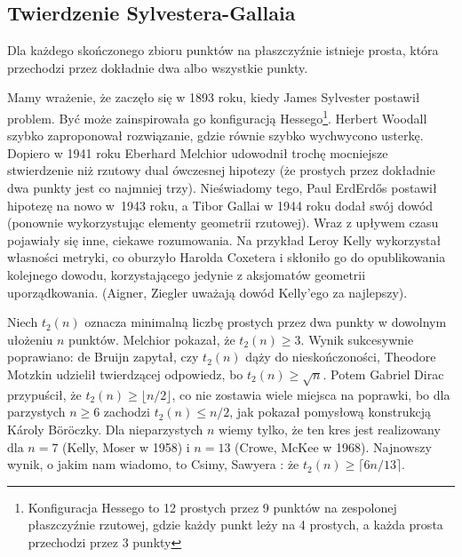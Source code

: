 

\subsection{Twierdzenie Sylvestera-Gallaia}
\begin{theorem}
	Dla każdego skończonego zbioru punktów na płaszczyźnie istnieje prosta, która przechodzi przez dokładnie dwa albo wszystkie punkty.
\end{theorem}

Mamy wrażenie, że zaczęło się w 1893 roku, kiedy James Sylvester postawił problem.
Być może zainspirowała go konfiguracją Hessego\footnote{Konfiguracja Hessego to 12 prostych przez 9 punktów na zespolonej płaszczyźnie rzutowej, gdzie każdy punkt leży na 4 prostych, a każda prosta przechodzi przez 3 punkty}.
Herbert Woodall szybko zaproponował rozwiązanie, gdzie równie szybko wychwycono usterkę.
Dopiero w 1941 roku Eberhard Melchior udowodnił trochę mocniejsze stwierdzenie niż rzutowy dual ówczesnej hipotezy (że prostych przez dokładnie dwa punkty jest co najmniej trzy).
Nieświadomy tego, Paul ErdErdős postawił hipotezę na nowo w~1943 roku, a Tibor Gallai w 1944 roku dodał swój dowód (ponownie wykorzystując elementy geometrii rzutowej).
Wraz z upływem czasu pojawiały się inne, ciekawe rozumowania.
Na przykład Leroy Kelly wykorzystał własności metryki, co oburzyło Harolda Coxetera i skłoniło go do opublikowania kolejnego dowodu, korzystającego jedynie z aksjomatów geometrii uporządkowania.
(Aigner, Ziegler uważają dowód Kelly'ego za najlepszy).

Niech $t_2(n)$ oznacza minimalną liczbę prostych przez dwa punkty w dowolnym ułożeniu $n$ punktów.
Melchior pokazał, że $t_2(n) \ge 3$.
Wynik sukcesywnie poprawiano:
de Bruijn \cite{debruijn_1948} zapytał, czy $t_2(n)$ dąży do nieskończoności,
Theodore Motzkin \cite{motzkin_1951} udzielił twierdzącej odpowiedz, bo $t_2(n) \ge \sqrt{n}$.
Potem Gabriel Dirac \cite{dirac_1951} przypuścił, że $t_2(n) \ge \lfloor n/2\rfloor$, co nie zostawia wiele miejsca na poprawki, bo dla parzystych $n \ge 6$ zachodzi $t_2(n) \le n/2$, jak pokazał pomysłową konstrukcją Károly Böröczky.
Dla nieparzystych $n$ wiemy tylko, że ten kres jest realizowany dla $n = 7$ (Kelly, Moser \cite{kelly_1958} w 1958) i $n = 13$ (Crowe, McKee \cite{mckee_1968} w 1968).
Najnowszy wynik, o jakim nam wiadomo, to Csimy, Sawyera \cite{csima_1993}: że $t_2(n) \ge \lceil 6n/13 \rceil$.

